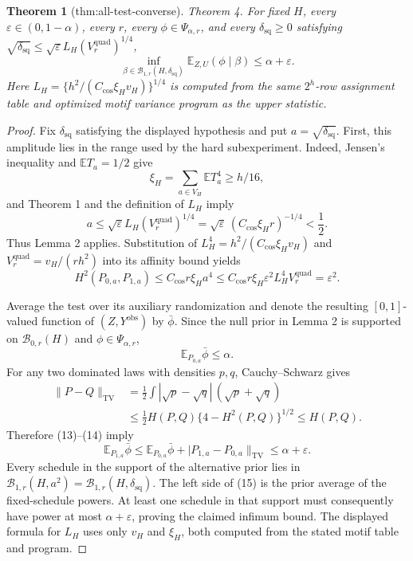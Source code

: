 \documentclass{article}
\newtheorem{theorem}{Theorem}
\begin{document}
\begin{theorem}[thm:all-test-converse]\label{thm:all-test-converse}
Theorem 4. For fixed \(H\), every \(\varepsilon\in(0,1-\alpha)\), every \(r\), every \(\phi\in\Psi_{\alpha,r}\), and every \(\delta_{\mathrm{sq}}\ge0\) satisfying \(\sqrt{\delta_{\mathrm{sq}}}\le\sqrt{\varepsilon}L_H(V^{\mathrm{quad}}_r)^{1/4}\), \[\inf_{\beta\in\mathcal B_{1,r}(H,\delta_{\mathrm{sq}})}\mathbb E_{Z,U}(\phi\mid\beta)\le\alpha+\varepsilon.\] Here \(L_H=\{h^2/(C_{\cos}\xi_Hv_H)\}^{1/4}\) is computed from the same \(2^h\)-row assignment table and optimized motif variance program as the upper statistic.
\end{theorem}
\begin{proof}
Fix \(\delta_{\mathrm{sq}}\) satisfying the displayed hypothesis and put \(a=\sqrt{\delta_{\mathrm{sq}}}\).  First, this amplitude lies in the range used by the hard subexperiment.  Indeed, Jensen's inequality and \(\mathbb ET_a=1/2\) give
\[
\xi_H=\sum_{a\in V_H}\mathbb ET_a^4\ge h/16,
\]
and Theorem 1 and the definition of \(L_H\) imply
\[
a\le\sqrt\varepsilon L_H(V_r^{\mathrm{quad}})^{1/4}
=\sqrt\varepsilon\,(C_{\cos}\xi_Hr)^{-1/4}<\frac12.
\]
Thus Lemma 2 applies.  Substitution of \(L_H^4=h^2/(C_{\cos}\xi_Hv_H)\) and \(V_r^{\mathrm{quad}}=v_H/(rh^2)\) into its affinity bound yields
\[
H^2(P_{0,a},P_{1,a})
\le C_{\cos}r\xi_Ha^4
\le C_{\cos}r\xi_H\varepsilon^2L_H^4V_r^{\mathrm{quad}}
=\varepsilon^2. \tag{13}
\]

Average the test over its auxiliary randomization and denote the resulting \([0,1]\)-valued function of \((Z,Y^{\mathrm{obs}})\) by \(\bar\phi\).  Since the null prior in Lemma 2 is supported on \(\mathcal B_{0,r}(H)\) and \(\phi\in\Psi_{\alpha,r}\),
\[
\mathbb E_{P_{0,a}}\bar\phi\le\alpha. \tag{14}
\]
For any two dominated laws with densities \(p,q\), Cauchy--Schwarz gives
\[
\begin{aligned}
\|P-Q\|_{\mathrm{TV}}
&=\frac12\int|\sqrt p-\sqrt q|\,(\sqrt p+\sqrt q)\\
&\le\frac12H(P,Q)\{4-H^2(P,Q)\}^{1/2}\le H(P,Q).
\end{aligned}
\]
Therefore (13)--(14) imply
\[
\mathbb E_{P_{1,a}}\bar\phi
\le\mathbb E_{P_{0,a}}\bar\phi+|P_{1,a}-P_{0,a}\|_{\mathrm{TV}}
\le\alpha+\varepsilon. \tag{15}
\]
Every schedule in the support of the alternative prior lies in \(\mathcal B_{1,r}(H,a^2)=\mathcal B_{1,r}(H,\delta_{\mathrm{sq}})\).  The left side of (15) is the prior average of the fixed-schedule powers.  At least one schedule in that support must consequently have power at most \(\alpha+\varepsilon\), proving the claimed infimum bound.  The displayed formula for \(L_H\) uses only \(v_H\) and \(\xi_H\), both computed from the stated motif table and program.
\end{proof}
\end{document}
